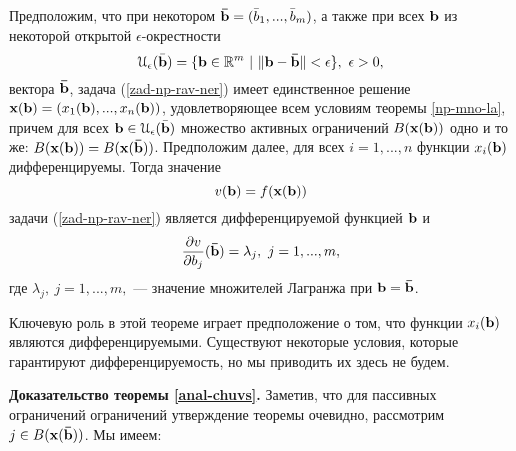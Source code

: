 \begin{teo}
    \label{anal-chuvs}
    Предположим, что при некотором $\mathbf{\bar{b}}=(\bar{b}_{1},...,\bar{b}_{m})$,
    а также при всех $\mathbf{b}$ из некоторой открытой
    $\epsilon$-окрестности
    \[\mathcal{U_{\epsilon}(\vc{\bar{b}})}=
    \{\vc{b}\in\R^{m} \ | \ \|\vc{b}-\vc{\bar{b}}\|<\epsilon\}, \ \epsilon>0,\]
    вектора  $\mathbf{\bar{b}}$,
    задача (\ref{zad-np-rav-ner}) имеет единственное решение
    $\mathbf{x(\mathbf{b})}=(x_{1}(\mathbf{b}),...,x_{n}(\mathbf{b}))$, удовлетворяющее всем условиям теоремы
    \ref{np-mno-la}, причем для всех
    $\mathbf{b}\in\mathcal{U_{\epsilon}(\mathbf{\bar{b}})}$ множество
    активных ограничений $B(\mathbf{x(\mathbf{b})})$ одно и то же:
    $B(\mathbf{x(\mathbf{b})})=B(\mathbf{x(\mathbf{\bar{b}})})$. Предположим далее,
    для всех $i=1,...,n$ функции $x_{i}(\mathbf{b})$ дифференцируемы.
    Тогда значение
    \[v(\mathbf{b})=f(\mathbf{x(\mathbf{b})})\]
    задачи (\ref{zad-np-rav-ner}) является дифференцируемой функцией
    $\mathbf{b}$ и
\begin{equation}
    \label{marg-znach}
    \frac{\partial v}{\partial b_{j}}(\vc{\bar{b}})=\lambda_{j}, \ j=1,...,m,
\end{equation}
    где $\lambda_{j}, \ j=1,...,m,$ --- значение множителей Лагранжа
    при $\mathbf{b}=\mathbf{\bar{b}}$.
\end{teo}

    Ключевую роль в этой теореме играет предположение о том, что
    функции $x_{i}(\mathbf{b})$ являются дифференцируемыми. Существуют
    некоторые условия, которые гарантируют дифференцируемость, но мы
    приводить их здесь не будем.

 \textbf{Доказательство теоремы \ref{anal-chuvs}.} Заметив, что для пассивных
    ограничений ограничений утверждение теоремы очевидно, рассмотрим
    $j\in B(\mathbf{x}(\mathbf{\bar{b}}))$. Мы имеем:

